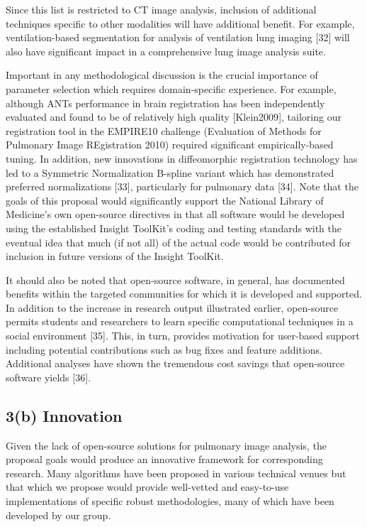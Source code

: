 \documentclass[11pt,]{article}
\begin{document}
Since this list is restricted to CT image analysis, inclusion of
additional techniques specific to other modalities will have additional
benefit. For example, ventilation-based segmentation for analysis of
ventilation lung imaging {[}32{]} will also have significant impact in a
comprehensive lung image analysis suite.

Important in any methodological discussion is the crucial importance of
parameter selection which requires domain-specific experience. For
example, although ANTs performance in brain registration has been
independently evaluated and found to be of relatively high quality
{[}Klein2009{]}, tailoring our registration tool in the EMPIRE10
challenge (Evaluation of Methods for Pulmonary Image REgistration 2010)
required significant empirically-based tuning. In addition, new
innovations in diffeomorphic registration technology has led to a
Symmetric Normalization B-spline variant which has demonstrated
preferred normalizations {[}33{]}, particularly for pulmonary data
{[}34{]}. Note that the goals of this proposal would significantly
support the National Library of Medicine's own open-source directives in
that all software would be developed using the established Insight
ToolKit's coding and testing standards with the eventual idea that much
(if not all) of the actual code would be contributed for inclusion in
future versions of the Insight ToolKit.

It should also be noted that open-source software, in general, has
documented benefits within the targeted communities for which it is
developed and supported. In addition to the increase in research output
illustrated earlier, open-source permits students and researchers to
learn specific computational techniques in a social environment
{[}35{]}. This, in turn, provides motivation for user-based support
including potential contributions such as bug fixes and feature
additions. Additional analyses have shown the tremendous cost savings
that open-source software yields {[}36{]}.

\subsection{\textbf{3(b) Innovation}}\label{b-innovation}

Given the lack of open-source solutions for pulmonary image analysis,
the proposal goals would produce an innovative framework for
corresponding research. Many algorithms have been proposed in various
technical venues but that which we propose would provide well-vetted and
easy-to-use implementations of specific robust methodologies, many of
which have been developed by our group.
\end{document}
